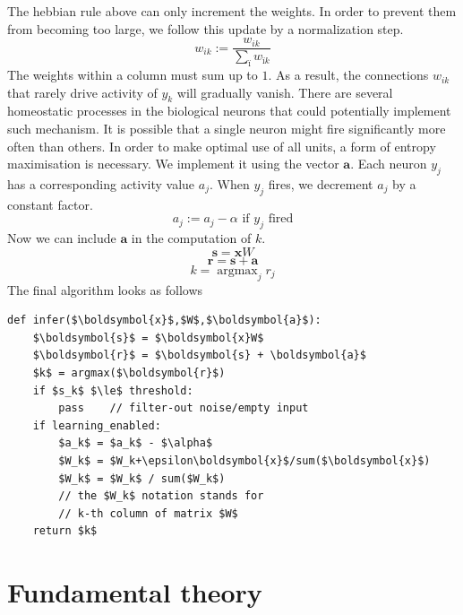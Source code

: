 \documentclass[12pt]{article}
\DeclareMathOperator*{\argmax}{argmax}
\begin{document}
The hebbian rule above can only increment the weights. In order to prevent them from becoming too large, we follow this update by a normalization step.
\[
w_{ik} := \frac{w_{ik}}{ \sum_{ï} w_{ïk}} 
\]
The weights within a column must sum up to $1$. As a result, the connections $w_{ik}$ that rarely drive activity of $y_k$ will gradually vanish. There are several homeostatic processes in the biological neurons that could potentially implement such mechanism.  
It is possible that a single neuron might fire significantly more often than others. In order to make optimal use of all units, a form of entropy maximisation is necessary. We implement it using the vector $\boldsymbol{a}$. Each neuron $y_j$ has a corresponding activity value $a_j$.
When $y_j$ fires, we decrement $a_j$ by a constant factor.
\[
a_j := a_j - \alpha \text{ if } y_j \text{ fired}
\]
Now we can include $\boldsymbol{a}$ in the computation of $k$.
\[\boldsymbol{s} = \boldsymbol{x}W \]
\[\boldsymbol{r} = \boldsymbol{s}+ \boldsymbol{a} \]
\[k = \argmax_j r_j \]
The final algorithm looks as follows
\begin{lstlisting}
def infer($\boldsymbol{x}$,$W$,$\boldsymbol{a}$):
    $\boldsymbol{s}$ = $\boldsymbol{x}W$
    $\boldsymbol{r}$ = $\boldsymbol{s} + \boldsymbol{a}$
    $k$ = argmax($\boldsymbol{r}$)
    if $s_k$ $\le$ threshold:
        pass    // filter-out noise/empty input
    if learning_enabled:
        $a_k$ = $a_k$ - $\alpha$
        $W_k$ = $W_k+\epsilon\boldsymbol{x}$/sum($\boldsymbol{x}$)
        $W_k$ = $W_k$ / sum($W_k$)
        // the $W_k$ notation stands for 
        // k-th column of matrix $W$
    return $k$
\end{lstlisting}

\section{Fundamental theory}
\end{document}
